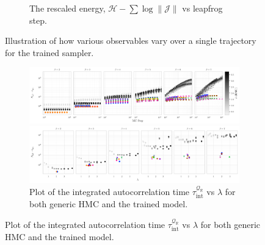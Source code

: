 \documentclass{article} %
\begin{document}
\begin{figure}[htpb]
\begin{subfigure}{0.31\textwidth}
      \caption{\label{fig:hwf}The rescaled energy, \(\mathcal{H}-\sum\log\|\mathcal{J}\|\) vs leapfrog step.}
   \end{subfigure}
   \hfill
   \caption{\label{fig:transformations}Illustration of how various observables vary over a single trajectory for the
   trained sampler.}
\end{figure}
%
\begin{figure}[htpb]
   \centering
   \begin{subfigure}{\linewidth}
      \includegraphics[width=\linewidth]{figures/autocorr_vs_mc_step.pdf}
      \caption{Plot of the integrated autocorrelation time \(\tau_{\mathrm{int}}^{\mathcal{Q}_{\mathbb{R}}}\) vs
      MC step for both generic HMC and the trained model, for \(\beta = 2, 3, \ldots, 7\) arranged from left to right.}
      \includegraphics[width=\linewidth]{figures/autocorr_vs_traj_len.pdf}
      \caption{Plot of the integrated autocorrelation time \(\tau_{\mathrm{int}}^{\mathcal{Q}_{\mathbb{R}}}\) vs
      \(\lambda\) for both generic HMC and the trained model.}
   \end{subfigure}
\end{figure}
%
\end{document}
